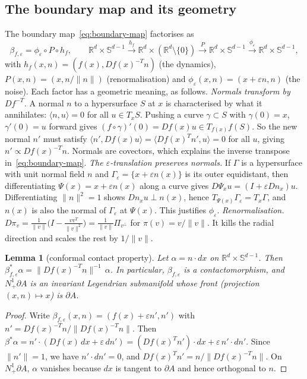 \documentclass[11pt,a4paper]{article}
\newtheorem{lemma}[theorem]{Lemma}
\theoremstyle{definition}
\theoremstyle{remark}
\newcommand{\R}{\mathbb{R}}
\newcommand{\eps}{\varepsilon}
\newcommand{\Sph}{\mathbb{S}}
\newcommand{\Nb}{N^1_+\partial A}
\begin{document}
\subsection{The boundary map and its geometry}\label{sec:bm-geometry}
The boundary map~\eqref{eq:boundary-map} factorises as
\begin{equation}\label{eq:factorisation}
  \beta_{f,\eps} = \phi_\eps\circ P\circ h_f,\qquad
  \R^d\times\Sph^{d-1}\xrightarrow{\ h_f\ }\R^d\times(\R^d\setminus\{0\})\xrightarrow{\ P\ }\R^d\times\Sph^{d-1}
  \xrightarrow{\ \phi_\eps\ }\R^d\times\Sph^{d-1},
\end{equation}
with $h_f(x,n)=(f(x),Df(x)^{-T}n)$ (the dynamics), $P(x,n)=(x,n/\|n\|)$ (renormalisation) and
$\phi_\eps(x,n)=(x+\eps n,n)$ (the noise). Each factor has a geometric meaning, as follows.
\newline
\newline \noindent \emph{Normals transform by $Df^{-T}$.} A normal $n$ to a hypersurface $S$ at $x$ is characterised by what it
annihilates: $\langle n,u\rangle=0$ for all $u\in T_xS$. Pushing a curve $\gamma\subset S$ with $\gamma(0)=x$,
$\gamma'(0)=u$ forward gives $(f\circ\gamma)'(0)=Df(x)u\in T_{f(x)}f(S)$. So the new normal $n'$ must satisfy
$\langle n',Df(x)u\rangle=\langle Df(x)^Tn',u\rangle=0$ for all $u$, giving $n'\propto Df(x)^{-T}n$. Normals are
covectors, which explains the inverse transpose in~\eqref{eq:boundary-map}.
\newline
\newline\noindent\emph{The $\eps$-translation preserves normals.} If $\Gamma$ is a hypersurface with unit normal field $n$ and
$\Gamma_\eps=\{x+\eps n(x)\}$ is its outer equidistant, then differentiating $\Psi(x)=x+\eps n(x)$ along a curve gives
$D\Psi_x u=(I+\eps Dn_x)u$. Differentiating $\|n\|^2=1$ shows $Dn_xu\perp n(x)$, hence $T_{\Psi(x)}\Gamma_\eps=T_x\Gamma$, and
$n(x)$ is also the normal of $\Gamma_\eps$ at $\Psi(x)$. This justifies $\phi_\eps$.
\newline
\newline \emph{Renormalisation.} $D\pi_v=\frac{1}{\|v\|}\bigl(I-\frac{vv^T}{\|v\|^2}\bigr)=\frac{1}{\|v\|}\Pi_{v^\perp}$ for
$\pi(v)=v/\|v\|$. It kills the radial direction and scales the rest by $1/\|v\|$.

\begin{lemma}[conformal contact property]\label{lem:contact}
Let $\alpha=n\cdot dx$ on $\R^d\times\Sph^{d-1}$. Then
$\beta_{f,\eps}^*\alpha=\|Df(x)^{-T}n\|^{-1}\,\alpha$. In particular, $\beta_{f,\eps}$ is a contactomorphism, and
$\Nb$ is an invariant Legendrian submanifold whose front (projection $(x,n)\mapsto x$) is $\partial A$.
\end{lemma}
\begin{proof}
Write $\beta_{f,\eps}(x,n)=(f(x)+\eps n',n')$ with $n'=Df(x)^{-T}n/\|Df(x)^{-T}n\|$. Then
$\beta^*\alpha=n'\cdot(Df(x)\,dx+\eps\,dn')=(Df(x)^Tn')\cdot dx+\eps\,n'\cdot dn'$. Since $\|n'\|=1$, we have
$n'\cdot dn'=0$, and $Df(x)^Tn'=n/\|Df(x)^{-T}n\|$. On $\Nb$, $\alpha$ vanishes because $dx$ is tangent to
$\partial A$ and hence orthogonal to $n$.
\end{proof}
\end{document}
